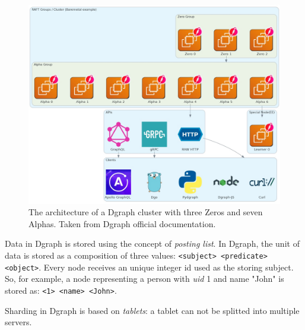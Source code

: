 \begin{figure}
    \centering
    \includegraphics[width=1\textwidth]{Figures/background/dgraph-architecture.jpg}
    \caption{The architecture of a Dgraph cluster with three Zeros and seven Alphas. Taken from Dgraph official documentation.}
    \label{fig:dgraph-architecture}
\end{figure}

Data in Dgraph is stored using the concept of \textit{posting list}. In Dgraph, the unit of data is stored as a composition of three values: \lstinline{<subject> <predicate> <object>}. Every node receives an unique integer id used as the storing subject. So, for example, a node representing a person with \textit{uid} 1 and name "John" is stored as: \lstinline{<1> <name> <John>}.

Sharding in Dgraph is based on \textit{tablets}: a tablet can not be splitted into multiple servers. 



